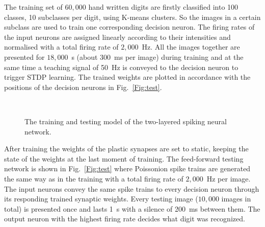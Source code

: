 \documentclass[journal]{journal}
\begin{document}
	The training set of $60,000$ hand written digits are firstly classified into 100 classes, 10 subclasses per digit, using K-means clusters.
	So the images in a certain subclass are used to train one corresponding decision neuron.
	The firing rates of the input neurons are assigned linearly according to their intensities and normalised with a total firing rate of $2,000$~Hz.
	All the images together are presented for $18,000$~s (about 300~ms per image) during training and at the same time a teaching signal of 50~Hz is conveyed to the decision neuron to trigger STDP learning.
	The trained weights are plotted in accordance with the positions of the decision neurons in Fig.~\ref{Fig:test}.
	\begin{figure}[thb!]
		\centering
		 \\
		
		\centering
		
		
		\caption{The training and testing model of the two-layered spiking neural network.}
		\label{fig:model}
	\end{figure}

	After training the weights of the plastic synapses are set to static, keeping the state of the weights at the last moment of training.
	The feed-forward testing network is shown in Fig.~\ref{Fig:test} where Poissonion spike trains are generated the same way as in the training with a total firing rate of $2,000$~Hz per image.
	The input neurons convey the same spike trains to every decision neuron through its responding trained synaptic weights. 
	Every testing image ($10,000$ images in total) is presented once and lasts 1~s with a silence of 200~ms between them.
	The output neuron with the highest firing rate decides what digit was recognized.
	
\end{document}
